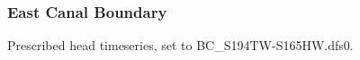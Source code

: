 %
%




\clearpage
\subsubsection{East Canal Boundary}
Prescribed head timeseries, set to BC\_S194TW-S165HW.dfs0.


